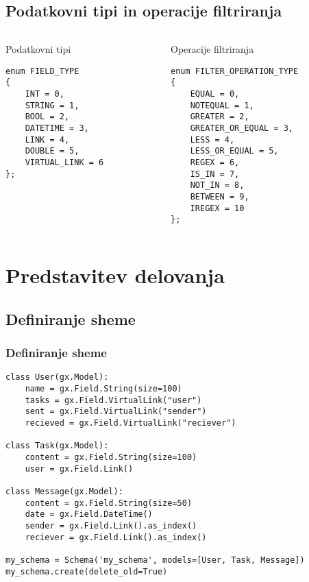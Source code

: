 \documentclass{beamer}
\begin{document}
    \subsection{Podatkovni tipi in operacije filtriranja}
    \begin{frame}[fragile]
    \begin{columns}[t]
        \begin{column}{0.48\textwidth}
            \begin{block}{Podatkovni tipi}
            \footnotesize
            \begin{verbatim}
enum FIELD_TYPE
{
    INT = 0,
    STRING = 1,
    BOOL = 2,
    DATETIME = 3,
    LINK = 4,
    DOUBLE = 5,
    VIRTUAL_LINK = 6
};




            \end{verbatim}
            \end{block}
        \end{column}
        \begin{column}{0.48\textwidth}
            \begin{block}{Operacije filtriranja}
            \footnotesize
            \begin{verbatim}
enum FILTER_OPERATION_TYPE
{
    EQUAL = 0,
    NOTEQUAL = 1,
    GREATER = 2,
    GREATER_OR_EQUAL = 3,
    LESS = 4,
    LESS_OR_EQUAL = 5,
    REGEX = 6,
    IS_IN = 7,
    NOT_IN = 8,
    BETWEEN = 9,
    IREGEX = 10
};
            \end{verbatim}
            \end{block}
        \end{column}
    \end{columns}
\end{frame}

\section{Predstavitev delovanja}
    \subsection{Definiranje sheme}
    \begin{frame}[fragile]
    \frametitle{Definiranje sheme}
    \footnotesize
        \begin{verbatim}
class User(gx.Model):
    name = gx.Field.String(size=100)
    tasks = gx.Field.VirtualLink("user")
    sent = gx.Field.VirtualLink("sender")
    recieved = gx.Field.VirtualLink("reciever")
    
class Task(gx.Model):
    content = gx.Field.String(size=100)
    user = gx.Field.Link()
    
class Message(gx.Model):
    content = gx.Field.String(size=50)
    date = gx.Field.DateTime()
    sender = gx.Field.Link().as_index()
    reciever = gx.Field.Link().as_index()

my_schema = Schema('my_schema', models=[User, Task, Message])
my_schema.create(delete_old=True)
        \end{verbatim}
    \end{frame}
\end{document}
